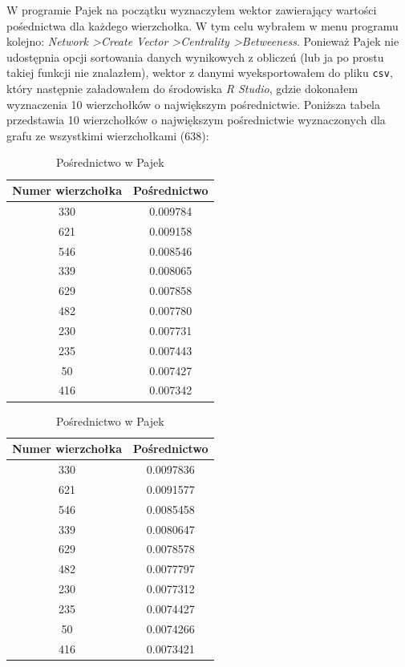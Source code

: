 \documentclass[a4paper,10pt]{article}
\begin{document}
			W programie Pajek na początku wyznaczyłem wektor zawierający wartości pośednictwa dla każdego wierzchołka. W tym celu wybrałem w menu programu kolejno: \textit{Network \textgreater Create Vector \textgreater Centrality \textgreater Betweeness}. Ponieważ Pajek nie udostępnia opcji sortowania danych wynikowych z obliczeń (lub ja po prostu takiej funkcji nie znalazłem), wektor z danymi wyeksportowałem do pliku \texttt{csv}, który następnie załadowałem do środowiska \textit{R Studio}, gdzie dokonałem wyznaczenia 10 wierzchołków o największym pośrednictwie. 
			Poniższa tabela przedstawia 10 wierzchołków o największym pośrednictwie wyznaczonych dla grafu ze wszystkimi wierzchołkami (638):
			\begin{table}[H]
			\parbox{.45\linewidth}{
			\caption*{Pośrednictwo w \mbox{NetworkX}}
			\begin{tabular}{ c | c } \hline
				Numer wierzchołka & Pośrednictwo \\ \hline
				330 & 0.009784  \\
				621 & 0.009158 \\
				546 & 0.008546 \\
				339 & 0.008065 \\
				629 & 0.007858 \\
				482 & 0.007780 \\
				230 & 0.007731 \\
				235 & 0.007443 \\
				50 & 0.007427 \\
				416 & 0.007342 \\\hline
			\end{tabular}
			}
			\hfill
			\parbox{.45\linewidth}{
			\caption*{Pośrednictwo w Pajek}
			\begin{tabular}{ c | c } \hline
				Numer wierzchołka & Pośrednictwo \\ \hline
				330 & 0.0097836 \\
				621 & 0.0091577 \\
				546 & 0.0085458 \\
				339 & 0.0080647 \\
				629 & 0.0078578 \\
				482 & 0.0077797 \\
				230 & 0.0077312 \\
				235 & 0.0074427 \\
				50  & 0.0074266 \\
				416  & 0.0073421 \\\hline
			\end{tabular}
			}
			\end{table}
\end{document}
